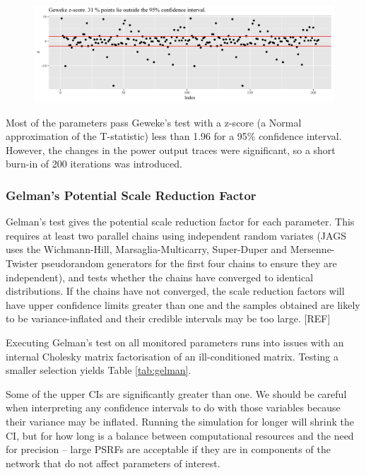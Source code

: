 \documentclass[a4paper, 12pt]{article}
\begin{document}
\begin{figure}
  \centering
  \includegraphics[width=\linewidth]{media/geweke}
  \label{fig:geweke}
\end{figure}

Most of the parameters pass Geweke's test with a z-score (a Normal approximation of the T-statistic) less than 1.96 for a 95\% confidence interval. However, the changes in the power output traces were significant, so a short burn-in of 200 iterations was introduced.

\subsubsection{Gelman's Potential Scale Reduction Factor}
Gelman's test gives the potential scale reduction factor for each parameter. This requires at least two parallel chains using independent random variates (JAGS uses the Wichmann-Hill, Marsaglia-Multicarry, Super-Duper and Mersenne-Twister pseudorandom generators for the first four chains to ensure they are independent), and tests whether the chains have converged to identical distributions. If the chains have not converged, the scale reduction factors will have upper confidence limits greater than one and the samples obtained are likely to be variance-inflated and their credible intervals may be too large. [REF]

Executing Gelman's test on all monitored parameters runs into issues with an internal Cholesky matrix factorisation of an ill-conditioned matrix. Testing a smaller selection yields Table \ref{tab:gelman}.



Some of the upper CIs are significantly greater than one. We should be careful when interpreting any confidence intervals to do with those variables because their variance may be inflated. Running the simulation for longer will shrink the CI, but for how long is a balance between computational resources and the need for precision -- large PSRFs are acceptable if they are in components of the network that do not affect parameters of interest.
\end{document}
